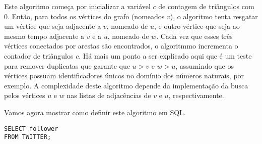 Este algoritmo começa por inicializar a variável $c$ de contagem de triângulos com $0$. Então, para
todos os vértices do grafo (nomeados $v$), o algoritmo tenta resgatar um vértice que seja adjacente a 
$v$, nomeado de $u$, e outro vértice que seja ao mesmo tempo adjacente a $v$ e a $u$, nomeado de $w$.
Cada vez que esses três vértices conectados por arestas são encontrados, o algoritmmo incrementa o 
contador de triângulos $c$. Há mais um ponto a ser explicado aqui que é um teste para remover duplicatas
que garante que $u>v$ e $w>u$, assumindo que os vértices possuam identificadores únicos no domínio dos
números naturais, por exemplo. A complexidade deste algoritmo depende da implementação da busca pelos 
vértices $u$ e $w$ nas listas de adjacências de $v$ e $u$, respectivamente.

Vamos agora mostrar como definir este algoritmo em SQL.

\begin{lstlisting}[style=MySQLStyle]
SELECT follower 
FROM TWITTER;
\end{lstlisting}

